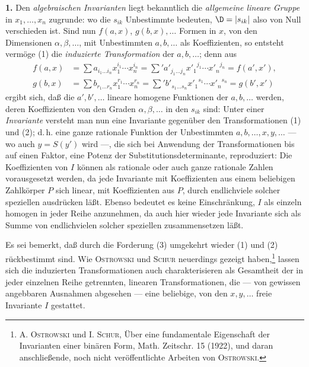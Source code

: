 \textbf{1.} Den \emph{algebraischen Invarianten} liegt bekanntlich die \emph{allgemeine lineare Gruppe} in $x_1,\ldots,x_n$ zugrunde:
wo die $s_{ik}$ Unbestimmte bedeuten, $\D=|s_{ik}|$ also von Null verschieden ist. Sind nun $f(a,x)$, $g(b,x),\ldots$ Formen in $x$, von den Dimensionen $\alpha,\beta,\ldots$, mit Unbestimmten $a,b,\ldots$ als Koeffizienten, so entsteht vermöge (1) die \emph{induzierte Transformation} der $a,b,\ldots$; denn aus
\[
\begin{aligned}
f(a,x)&=\sum a_{i_1\ldots i_n}x_1^{i_1}\cdots x_n^{i_n}
      =\sum{}' a'_{j_1\ldots j_n}{x'_1}^{j_1}\cdots {x'_n}^{j_n}
      =f(a',x'),\\
g(b,x)&=\sum b_{r_1\ldots r_n}x_1^{r_1}\cdots x_n^{r_n}
      =\sum{}' b'_{s_1\ldots s_n}{x'_1}^{s_1}\cdots {x'_n}^{s_n}
      =g(b',x')
\end{aligned}
\]
ergibt sich, daß die $a',b',\ldots$ lineare homogene Funktionen der $a,b,\ldots$ werden, deren Koeffizienten von den Graden $\alpha,\beta,\ldots$ in den $s_{ik}$ sind:
Unter einer \emph{Invariante} versteht man nun eine Invariante gegenüber den Transformationen (1) und (2); d.\,h. eine ganze rationale Funktion der Unbestimmten $a,b,\ldots,x,y,\ldots$ --- wo auch $y=S(y')$ wird ---, die sich bei Anwendung der Transformationen bis auf einen Faktor, eine Potenz der Substitutionsdeterminante, reproduziert:
Die Koeffizienten von $I$ können als rationale oder auch ganze rationale Zahlen vorausgesetzt werden, da jede Invariante mit Koeffizienten aus einem beliebigen Zahlkörper $P$ sich linear, mit Koeffizienten aus $P$, durch endlichviele solcher speziellen ausdrücken läßt. Ebenso bedeutet es keine Einschränkung, $I$ als einzeln homogen in jeder Reihe anzunehmen, da auch hier wieder jede Invariante sich als Summe von endlichvielen solcher speziellen zusammensetzen läßt.

Es sei bemerkt, daß durch die Forderung (3) umgekehrt wieder (1) und (2) rückbestimmt sind. Wie \textsc{Ostrowski} und \textsc{Schur} neuerdings gezeigt haben,\footnote{A. \textsc{Ostrowski} und I. \textsc{Schur}, Über eine fundamentale Eigenschaft der Invarianten einer binären Form, Math. Zeitschr. 15 (1922), und daran anschließende, noch nicht veröffentlichte Arbeiten von \textsc{Ostrowski}.} lassen sich die induzierten Transformationen auch charakterisieren als Gesamtheit der in jeder einzelnen Reihe getrennten, linearen Transformationen, die --- von gewissen angebbaren Ausnahmen abgesehen --- eine beliebige, von den $x,y,\ldots$ freie Invariante $I$ gestattet.

